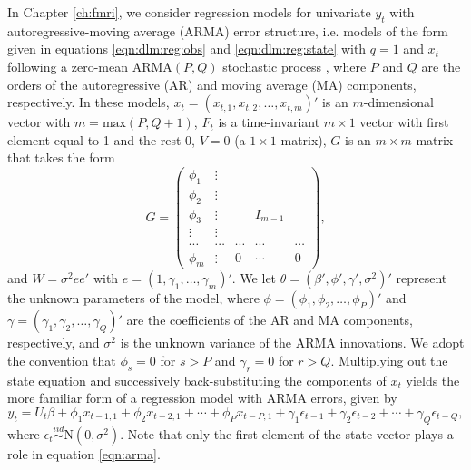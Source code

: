 In Chapter \ref{ch:fmri}, we consider regression models for univariate $y_t$ with autoregressive-moving average (ARMA) error structure, i.e. models of the form given in equations \eqref{eqn:dlm:reg:obs} and \eqref{eqn:dlm:reg:state} with $q = 1$ and $x_t$ following a zero-mean $\mbox{ARMA}(P, Q)$ stochastic process \citep{shum:stof:2006:timeseries}, where $P$ and $Q$ are the orders of the autoregressive (AR) and moving average (MA) components, respectively. In these models, $x_t = (x_{t,1} ,x_{t,2}, \ldots, x_{t,m})'$ is an $m$-dimensional vector with $m = \mbox{max}(P,Q+1)$, $F_t$ is a time-invariant $m \times 1$ vector with first element equal to 1 and the rest 0, $V = 0$ (a $1 \times 1$ matrix), $G$ is an $m \times m$ matrix that takes the form
\begin{equation}
G = \left(
 \begin{array}{ccccc}
 \phi_1 & \vdots \\
 \phi_2 & \vdots \\
 \phi_3 & \vdots && I_{m-1} \\
 \vdots & \vdots \\
 \cdots & \cdots & \cdots & \cdots & \cdots \\
 \phi_m &\vdots & 0 & \cdots & 0
 \end{array}
\right) \label{eqn:dlm:arma:g},
\end{equation}
and $W = \sigma^2ee'$ with $e = (1, \gamma_1, \ldots, \gamma_m)'$. We let $\theta = (\beta', \phi', \gamma', \sigma^2)'$ represent the unknown parameters of the model, where $\phi = (\phi_1,\phi_2,\ldots,\phi_P)'$ and $\gamma = (\gamma_1,\gamma_2,\ldots,\gamma_Q)'$ are the coefficients of the AR and MA components, respectively, and $\sigma^2$ is the unknown variance of the ARMA innovations. We adopt the convention that $\phi_s = 0$ for $s > P$ and $\gamma_r = 0$ for $r > Q$. Multiplying out the state equation and successively back-substituting the components of $x_t$ \cite[see Sec 3.2.5,][]{petris:camp:2009:dynamic} yields the more familiar form of a regression model with ARMA errors, given by
\begin{equation}
y_t = U_t\beta + \phi_1x_{t-1,1} + \phi_2x_{t-2,1} + \cdots + \phi_Px_{t-P,1} + \gamma_1\epsilon_{t-1} + \gamma_2\epsilon_{t-2} + \cdots + \gamma_Q\epsilon_{t-Q}, \label{eqn:arma}
\end{equation}
where $\epsilon_t \stackrel{iid}{\sim} \mbox{N}(0,\sigma^2)$. Note that only the first element of the state vector plays a role in equation \eqref{eqn:arma}.

